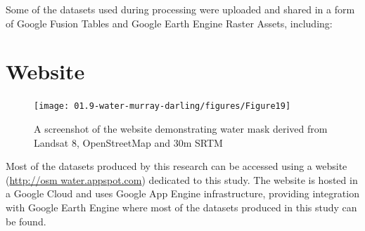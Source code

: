 Some of the datasets used during processing were uploaded and shared in a form of Google Fusion Tables and Google Earth Engine Raster Assets, including:


\begin{table}
	\centering
	\caption{List of vector and raster datasets available online}
	\label{table:au-datasets-output}
	\small
{}
\end{table}

\section{Website}


\begin{figure}
	\centering
	\texttt{[image: 01.9-water-murray-darling/figures/Figure19]}
	\caption{A screenshot of the website demonstrating water mask derived from Landsat 8, OpenStreetMap and 30m SRTM}
\end{figure}

Most of the datasets produced by this research can be accessed using a website (\url{http://osm water.appspot.com}) dedicated to this study. The website is hosted in a Google Cloud and uses Google App Engine infrastructure, providing integration with Google Earth Engine where most of the datasets produced in this study can be found.

